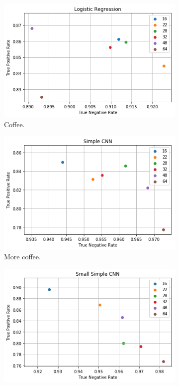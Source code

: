 \begin{figure}[h!]
  \centering
  \begin{subfigure}[b]{0.45\linewidth}
    \includegraphics[width=\linewidth]{images/logreg_patch}
    \caption{Coffee.}
  \end{subfigure}
  \begin{subfigure}[b]{0.45\linewidth}
    \includegraphics[width=\linewidth]{images/cnn_patch}
    \caption{More coffee.}
  \end{subfigure}
  \begin{subfigure}[b]{0.45\linewidth}
    \includegraphics[width=\linewidth]{images/smallcnn_patch}

\end{subfigure}
\end{figure}
